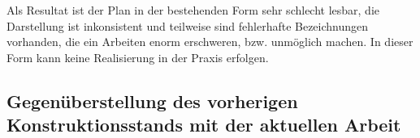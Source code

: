 \documentclass[12pt,a4paper]{scrartcl}	%
\begin{document}
Als Resultat ist der Plan in der bestehenden Form sehr schlecht lesbar, die Darstellung ist inkonsistent und teilweise sind  fehlerhafte Bezeichnungen vorhanden, die ein Arbeiten enorm erschweren, bzw. unmöglich machen. In dieser Form kann keine Realisierung in der Praxis erfolgen.
\subsection{Gegenüberstellung des vorherigen Konstruktionsstands mit der aktuellen Arbeit}
\end{document}
